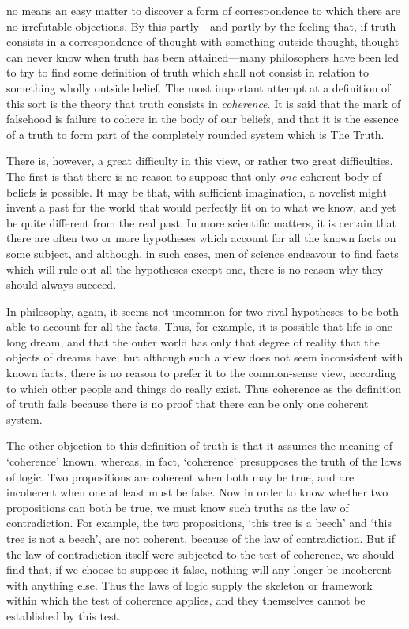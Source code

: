 \documentclass[oneside,letterpaper,12pt]{book}
\begin{document}
no means an easy matter to discover a form of correspondence to which
there are no irrefutable objections. By this partly---and partly by the
feeling that, if truth consists in a correspondence of thought with
something outside thought, thought can never know when truth has been
attained---many philosophers have been led to try to find some
definition of truth which shall not consist in relation to something
wholly outside belief. The most important attempt at a definition of
this sort is the theory that truth consists in \emph{coherence}. \label{coherence} It is
said that the mark of falsehood is failure to cohere in the body of our
beliefs, and that it is the essence of a truth to form part of the
completely rounded system which is The Truth.

There is, however, a great difficulty in this view, or rather two great
difficulties. \label{multiple} The first is that there is no reason to suppose that only
\emph{one} coherent body of beliefs is possible. It may be that, with
sufficient imagination, a novelist might invent a past for the world
that would perfectly fit on to what we know, and yet be quite different
from the real past. In more scientific matters, it is certain that there
are often two or more hypotheses which account for all the known facts
on some subject, and although, in such cases, men of science endeavour
to find facts which will rule out all the hypotheses except one, there
is no reason why they should always succeed.

In philosophy, again, it seems not uncommon for two rival hypotheses to
be both able to account for all the facts. Thus, for example, it is
possible that life is one long dream, and that the outer world has only
that degree of reality that the objects of dreams have; but although
such a view does not seem inconsistent with known facts, there is no
reason to prefer it to the common-sense view, according to which other
people and things do really exist. Thus coherence as the definition of
truth fails because there is no proof that there can be only one
coherent system.

The other objection to this definition of truth is that it assumes the
meaning of `coherence' known, whereas,
in fact, `coherence' presupposes the
truth of the laws of logic. \label{laws} Two propositions are coherent when both may
be true, and are incoherent when one at least must be false. Now in
order to know whether two propositions can both be true, we must know
such truths as the law of contradiction. For example, the two
propositions, `this tree is a beech'
and `this tree is not a beech', are not
coherent, because of the law of contradiction. But if the law of
contradiction itself were subjected to the test of coherence, we should
find that, if we choose to suppose it false, nothing will any longer be
incoherent with anything else. Thus the laws of logic supply the
skeleton or framework within which the test of coherence applies, and
they themselves cannot be established by this test.
\end{document}
